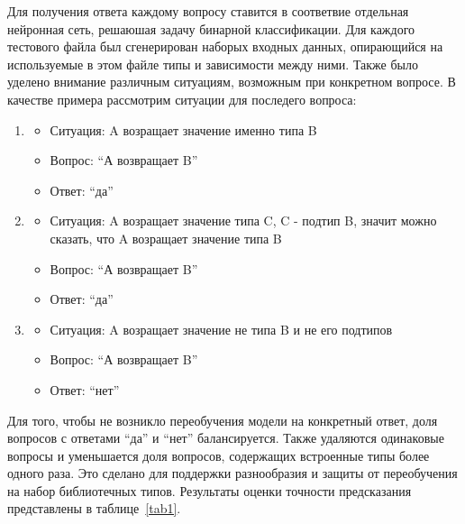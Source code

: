 \documentclass[times,specification,annotation]{itmo-student-thesis}
\begin{document}
Для получения ответа каждому вопросу ставится в соответвие отдельная нейронная сеть, решаюшая задачу бинарной классификации. Для каждого тестового файла был сгенерирован наборых входных данных, опирающийся на используемые в этом файле типы и зависимости между ними. Также было уделено внимание различным ситуациям, возможным при конкретном вопросе. В качестве примера рассмотрим ситуации для последего вопроса:
\begin{enumerate}
    \item
        \begin{itemize}
            \item Ситуация: A возращает значение именно типа B
            \item Вопрос: ``А возвращает B''
            \item Ответ: ``да''
        \end{itemize}
    \item 
        \begin{itemize}
            \item Ситуация: A возращает значение типа C, C - подтип B, значит можно сказать, что A возращает значение типа B
            \item Вопрос: ``А возвращает B''
            \item Ответ: ``да''
        \end{itemize}
    \item 
        \begin{itemize}
            \item Ситуация: A возращает значение не типа B и не его подтипов
            \item Вопрос: ``А возвращает B''
            \item Ответ: ``нет''
        \end{itemize}
\end{enumerate}

Для того, чтобы не возникло переобучения модели на конкретный ответ, доля вопросов с ответами ``да'' и ``нет'' балансируется. Также удаляются одинаковые вопросы и уменьшается доля вопросов, содержащих встроенные типы более одного раза. Это сделано для поддержки разнообразия и защиты от переобучения на набор библиотечных типов. Результаты оценки точности предсказания представлены в таблице~\ref{tab1}.
\end{document}
